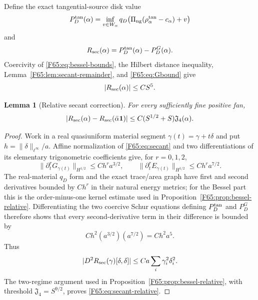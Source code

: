 \documentclass[11pt]{amsart}
\numberwithin{equation}{section}
\newtheorem{lemma}[theorem]{Lemma}
\theoremstyle{definition}
\theoremstyle{remark}
\newcommand{\PiNG}{\Pi_{\rm ng}}
\newcommand{\Jfour}{\mathfrak J_4}
\newcommand{\qdisk}{q_D}
\begin{document}
Define the exact tangential-source disk value
\begin{equation}\label{F65:eq:PDtan}
 P_D^{\rm tan}(\alpha)
 =\inf_{v\in W_\alpha}
 \qdisk\bigl(\PiNG(\rho_\alpha^{\rm tan}-c_\alpha)+v\bigr)
\end{equation}
and
\begin{equation}
 R_{\rm sec}(\alpha)=P_D^{\rm tan}(\alpha)-P_D^G(\alpha).
\end{equation}
Coercivity of \eqref{F65:eq:bessel-bounds}, the Hilbert distance inequality,
Lemma~\ref{F65:lem:secant-remainder}, and \eqref{F65:eq:Gbound} give
\begin{equation}\label{F65:eq:secant-absolute}
 |R_{\rm sec}(\alpha)|\le CS^5.
\end{equation}

\begin{lemma}[Relative secant correction]\label{F65:lem:secant-relative}
For every sufficiently fine positive fan,
\begin{equation}\label{F65:eq:secant-relative}
 |R_{\rm sec}(\alpha)-R_{\rm sec}(\bar\alpha\mathbf1)|
 \le C(S^{1/2}+S)\Jfour(\alpha).
\end{equation}
\end{lemma}

\begin{proof}
Work in a real quasiuniform material segment
$\gamma(t)=\gamma+t\delta$ and put
$h=\|\delta\|_{\ell^\infty}/a$.  Affine normalization of
\eqref{F65:eq:secant} and two differentiations of its elementary trigonometric
coefficients give, for $r=0,1,2$,
\begin{equation}
 \|\partial_t^rG_{\gamma(t)}\|_{H^{1/2}}
 \le Ch^ra^{3/2},
 \qquad
 \|\partial_t^rE_{\gamma(t)}\|_{H^{1/2}}
 \le Ch^ra^{7/2}.
\end{equation}
The real-material $q_D$ form and the exact trace/area graph have first and
second derivatives bounded by $Ch^r$ in their natural energy metrics; for
the Bessel part this is the order-minus-one kernel estimate used in
Proposition~\ref{F65:prop:bessel-relative}.  Differentiating the two coercive
Schur equations defining $P_D^{\rm tan}$ and $P_D^G$ therefore shows that
every second-derivative term in their difference is bounded by
\begin{equation}
 Ch^2(a^{3/2})(a^{7/2})=Ch^2a^5.
\end{equation}
Thus
\begin{equation}
 |D^2R_{\rm sec}(\gamma)[\delta,\delta]|
 \le Ca\sum_i\gamma_i^2\delta_i^2.
\end{equation}
The two-regime argument used in Proposition~\ref{F65:prop:bessel-relative},
with threshold $\Jfour=S^{9/2}$, proves \eqref{F65:eq:secant-relative}.
\end{proof}
\end{document}
